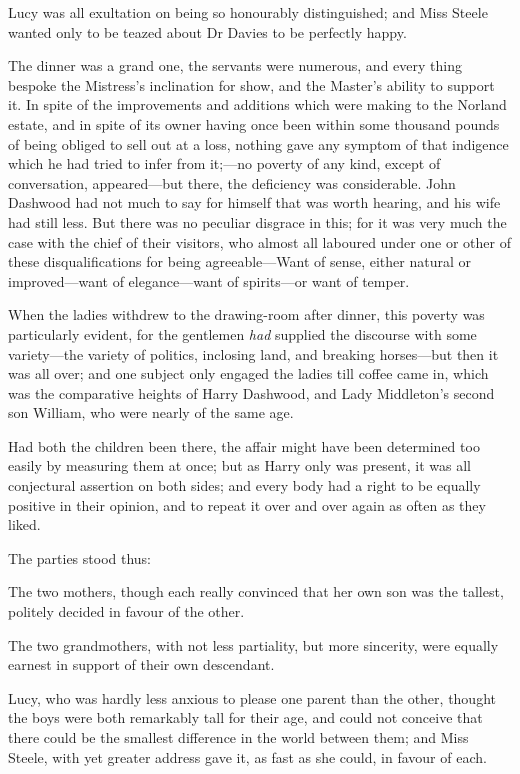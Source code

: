 Lucy was all exultation on being so honourably distinguished; and Miss Steele wanted only to be teazed about Dr Davies to be perfectly happy.

The dinner was a grand one, the servants were numerous, and every thing bespoke the Mistress's inclination for show, and the Master's ability to support it. In spite of the improvements and additions which were making to the Norland estate, and in spite of its owner having once been within some thousand pounds of being obliged to sell out at a loss, nothing gave any symptom of that indigence which he had tried to infer from it;—no poverty of any kind, except of conversation, appeared—but there, the deficiency was considerable. John Dashwood had not much to say for himself that was worth hearing, and his wife had still less. But there was no peculiar disgrace in this; for it was very much the case with the chief of their visitors, who almost all laboured under one or other of these disqualifications for being agreeable—Want of sense, either natural or improved—want of elegance—want of spirits—or want of temper.

When the ladies withdrew to the drawing-room after dinner, this poverty was particularly evident, for the gentlemen \textit{had} supplied the discourse with some variety—the variety of politics, inclosing land, and breaking horses—but then it was all over; and one subject only engaged the ladies till coffee came in, which was the comparative heights of Harry Dashwood, and Lady Middleton's second son William, who were nearly of the same age.

Had both the children been there, the affair might have been determined too easily by measuring them at once; but as Harry only was present, it was all conjectural assertion on both sides; and every body had a right to be equally positive in their opinion, and to repeat it over and over again as often as they liked.

The parties stood thus:

The two mothers, though each really convinced that her own son was the tallest, politely decided in favour of the other.

The two grandmothers, with not less partiality, but more sincerity, were equally earnest in support of their own descendant.

Lucy, who was hardly less anxious to please one parent than the other, thought the boys were both remarkably tall for their age, and could not conceive that there could be the smallest difference in the world between them; and Miss Steele, with yet greater address gave it, as fast as she could, in favour of each.

